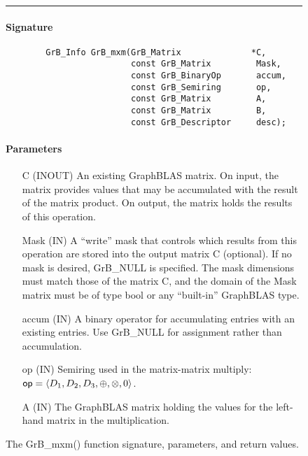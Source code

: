 \begin{figure*}[ht!]
\hrule
	\caption{The {\sf GrB\_mxm()} function signature, parameters, and return values.}
\label{Fig:mxm}
\paragraph{Signature}
\footnotesize
\begin{verbatim}
        GrB_Info GrB_mxm(GrB_Matrix              *C,
                         const GrB_Matrix         Mask,
                         const GrB_BinaryOp       accum,
                         const GrB_Semiring       op,
                         const GrB_Matrix         A, 
                         const GrB_Matrix         B,
                         const GrB_Descriptor     desc);
\end{verbatim}

\paragraph{Parameters}

\begin{itemize}[leftmargin=1.1in]
    \item[{\sf C}]    ({\sf INOUT}) An existing GraphBLAS matrix. On
    input, the matrix provides values that may be accumulated with the
    result of the matrix product.   On output, the matrix holds the
    results of this operation.

    \item[{\sf Mask}] ({\sf IN}) A ``write'' mask that controls which
    results from this operation are stored into the output matrix
    {\sf C} (optional).  If no mask is desired,  {\sf GrB\_NULL}
    is specified. The mask dimensions must match those of the
    matrix {\sf C}, and the domain of the {\sf Mask} matrix must be
    of type {\sf bool} or any ``built-in'' GraphBLAS type.

    \item[{\sf accum}] ({\sf IN}) A binary operator for accumulating entries
    with an existing  entries.  Use {\sf GrB\_NULL} for assignment rather than accumulation.

    \item[{\sf op}] ({\sf IN}) Semiring used in the matrix-matrix
    multiply: ${\sf op}=\langle D_1,D_2,D_3,\oplus,\otimes,0 \rangle$.

    \item[{\sf A}] ({\sf IN}) The GraphBLAS matrix holding the values
    for the left-hand matrix in the multiplication.


\end{itemize}
\end{figure*}
